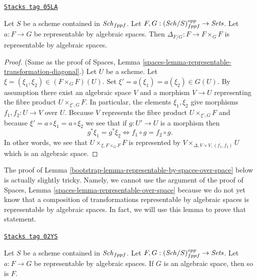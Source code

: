 \begin{lemma}
\label{bootstrap-lemma-representable-by-spaces-transformation-diagonal}
\href{https://stacks.math.columbia.edu/tag/05LA}{\texttt{Stacks tag 05LA}}

Let $S$ be a scheme contained in $\mathit{Sch}_{fppf}$.
Let $F, G : (\mathit{Sch}/S)_{fppf}^{opp} \to \textit{Sets}$.
Let $a : F \to G$ be representable by algebraic spaces.
Then $\Delta_{F/G} : F \to F \times_G F$ is representable by
algebraic spaces.
\end{lemma}

\begin{proof}
(Same as the proof of
Spaces, Lemma \ref{spaces-lemma-representable-transformation-diagonal}.)
Let $U$ be a scheme. Let $\xi = (\xi_1, \xi_2) \in (F \times_G F)(U)$.
Set $\xi' = a(\xi_1) = a(\xi_2) \in G(U)$.
By assumption there exist an algebraic space $V$ and a morphism $V \to U$
representing the fibre product $U \times_{\xi', G} F$.
In particular, the elements $\xi_1, \xi_2$ give morphisms
$f_1, f_2 : U \to V$ over $U$. Because $V$ represents the
fibre product $U \times_{\xi', G} F$ and because
$\xi' = a \circ \xi_1 = a \circ \xi_2$
we see that if $g : U' \to U$ is a morphism then
$$
g^*\xi_1 = g^*\xi_2
\Leftrightarrow
f_1 \circ g = f_2 \circ g.
$$
In other words, we see that $U \times_{\xi, F \times_G F} F$
is represented by $V \times_{\Delta, V \times V, (f_1, f_2)} U$
which is an algebraic space.
\end{proof}

The proof of
Lemma \ref{bootstrap-lemma-representable-by-spaces-over-space}
below is actually slightly tricky. Namely,
we cannot use the argument of the proof of
Spaces, Lemma \ref{spaces-lemma-representable-over-space}
because we do not yet know that a composition of transformations
representable by algebraic spaces is representable by algebraic
spaces. In fact, we will use this lemma to prove that statement.

\begin{lemma}
\label{bootstrap-lemma-representable-by-spaces-over-space}
\href{https://stacks.math.columbia.edu/tag/02YS}{\texttt{Stacks tag 02YS}}

Let $S$ be a scheme contained in $\mathit{Sch}_{fppf}$.
Let $F, G : (\mathit{Sch}/S)_{fppf}^{opp} \to \textit{Sets}$.
Let $a : F \to G$ be representable by algebraic spaces.
If $G$ is an algebraic space, then so is $F$.
\end{lemma}

